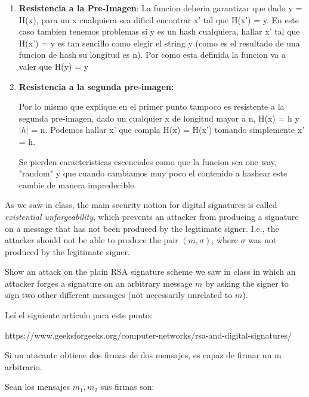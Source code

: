 \documentclass[12pt,addpoints,answers]{exam}
\begin{document}
\begin{questions}
\begin{solution}
\begin{enumerate}
        \item \textbf{Resistencia a la Pre-Imagen}:
        La funcion deberia garantizar que dado y = H(x), para un x cualquiera sea dificil encontrar x' tal que H(x') = y.
        En este caso tambien tenemos problemas si y es un hash cualquiera, hallar x' tal que H(x') = y
        es tan sencillo como elegir el string y (como es el resultado de una funcion de hash su longitud es n). 
        Por como esta definida la funcion va a valer que
        H(y) = y

        \item \textbf{Resistencia a la segunda pre-imagen:} 

        Por lo mismo que explique en el primer punto tampoco es resistente a la segunda pre-imagen, dado un cualquier x 
        de longitud mayor a n, H(x) = h y $|h|$ =  n. Podemos hallar x' que compla H(x) = H(x') tomando simplemente  x' = h.
        

        Se pierden caracteristicas escenciales como que la funcion sea one way, "random" y que cuando cambiamos muy poco
        el contenido a hashear este cambie de manera impredecible.
    \end{enumerate}
\end{solution}

\newpage

\question[10] As we saw in class, the main security notion for digital signatures is called {\em existential unforgeability}, which prevents an attacker from producing a signature on a message that has not been produced by the legitimate signer. I.e., the attacker should not be able to produce the pair $(m, \sigma)$, where $\sigma$ was not produced by the legitimate signer. 

Show an attack on the plain RSA signature scheme we saw in class in which an attacker forges a signature on an arbitrary message $m$ by asking the signer to sign two other different messages (not necessarily unrelated to $m$).

\begin{solution} %

    Leí el siguiente artículo para este punto: 
    
    https://www.geeksforgeeks.org/computer-networks/rsa-and-digital-signatures/

    Si un atacante obtiene dos firmas de dos mensajes, es capaz de firmar un m arbitrario.

    Sean los mensajes $m_1, m_2$ sus firmas son:
    

\end{solution}
\end{questions}
\end{document}
